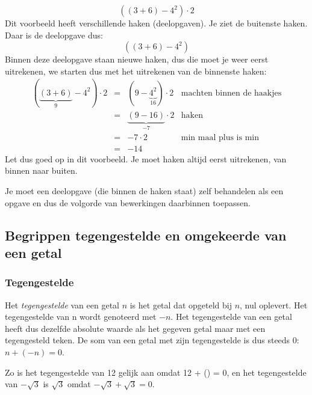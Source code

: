 \begin{voorbeeld}
\begin{equation*}
((3+6)-4^2)\cdot 2
\end{equation*}
Dit voorbeeld heeft verschillende haken (deelopgaven). Je ziet de buitenste haken. Daar is de deelopgave dus:
\begin{equation*}
((3+6)-4^2)
\end{equation*}
Binnen deze deelopgave staan nieuwe haken, dus die moet je weer eerst uitrekenen, we starten dus met het uitrekenen van de binnenste haken:
\begin{equation*}
\begin{array}{cclr}
\left( \underbrace{(3+6)}_{9}-4^2\right)\cdot 2 &=& \left( 9-\underbrace{4^2}_{16}\right)\cdot 2 & \text{machten binnen de haakjes} \\
&=& \underbrace{(9-16)}_{-7}\cdot 2 & \text{haken} \\
&=& -7 \cdot 2 & \text{min maal plus is min} \\
&=& -14
\end{array}
\end{equation*}
Let dus goed op in dit voorbeeld. Je moet haken altijd eerst uitrekenen, van binnen naar buiten.

Je moet een deelopgave (die binnen de haken staat) zelf behandelen als een opgave en dus de volgorde van bewerkingen daarbinnen toepassen.

\end{voorbeeld}
\subsection{Begrippen tegengestelde en omgekeerde van een getal}

\subsubsection{Tegengestelde}

Het \emph{tegengestelde} van een getal $n$ is het getal dat opgeteld
bij $n$, nul oplevert. Het tegengestelde van n wordt genoteerd met
$-n$. Het tegengestelde van een getal heeft dus dezelfde absolute
waarde als het gegeven getal maar met een tegengesteld teken. De som
van een getal met zijn tegengestelde is dus steeds 0: $n+(-n)=0$.

Zo is het tegengestelde van 12 gelijk aan 
omdat 12 + () = 0, en het tegengestelde van $-\sqrt{3}$
is $\sqrt{3}$ omdat $-\sqrt{3}+\sqrt{3}=0$.




